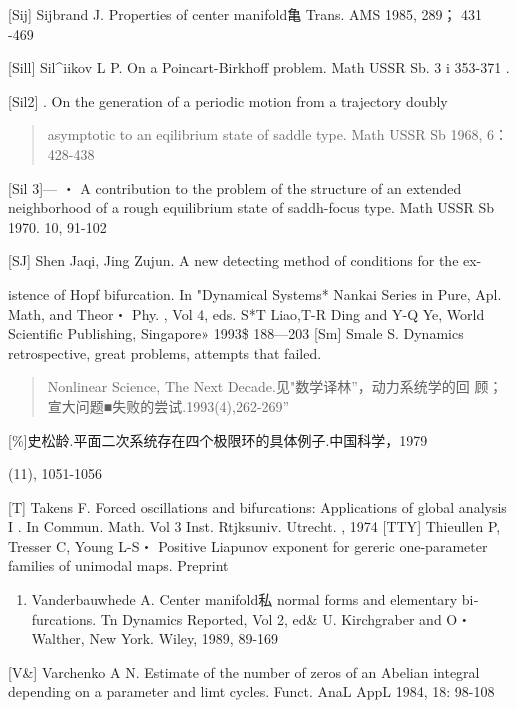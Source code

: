{[}Sij{]} Sijbrand J. Properties of center manifold亀 Trans. AMS 1985,
289； 431 -469

{[}Sill{]} Sil\^{}iikov L P. On a Poincart-Birkhoff problem. Math USSR
Sb. 3 i 353-371 .

{[}Sil2{]} . On the generation of a periodic motion from a trajectory
doubly

\begin{quote}
asymptotic to an eqilibrium state of saddle type. Math USSR Sb 1968, 6：
428-438
\end{quote}

{[}Sil 3{]}--- ・ A contribution to the problem of the structure of an
extended neighborhood of a rough equilibrium state of saddh-focus type.
Math USSR Sb 1970. 10, 91-102

{[}SJ{]} Shen Jaqi, Jing Zujun. A new detecting method of conditions for
the ex-

istence of Hopf bifurcation. In "Dynamical Systems* Nankai Series in
Pure, Apl. Math, and Theor・ Phy. , Vol 4, eds. S*T Liao,T-R Ding and
Y-Q Ye, World Scientific Publishing, Singapore» 1993\$ 188---203
{[}Sm{]} Smale S. Dynamics retrospective, great problems, attempts that
failed.

\begin{quote}
Nonlinear Science, The Next Decade.见"数学译林''，动力系统学的回
顾；宣大问题■失败的尝试.1993(4),262-269''
\end{quote}

{[}\%{]}史松龄.平面二次系统存在四个极限环的具体例子.中国科学，1979

(11), 1051-1056

{[}T{]} Takens F. Forced oscillations and bifurcations: Applications of
global analysis I . In Commun. Math. Vol 3 Inst. Rtjksuniv. Utrecht. ,
1974 {[}TTY{]} Thieullen P, Tresser C, Young L-S・ Positive Liapunov
exponent for gereric one-parameter families of unimodal maps. Preprint

\begin{enumerate}
\def\labelenumi{\Roman{enumi}.}
\setcounter{enumi}{4}
\item
  Vanderbauwhede A. Center manifold私 normal forms and elementary
  bi­furcations. Tn Dynamics Reported, Vol 2, ed\& U. Kirchgraber and
  O・ Walther, New York. Wiley, 1989, 89-169
\end{enumerate}

{[}V\&{]} Varchenko A N. Estimate of the number of zeros of an Abelian
integral depending on a parameter and limt cycles. Funct. AnaL AppL
1984, 18: 98-108

